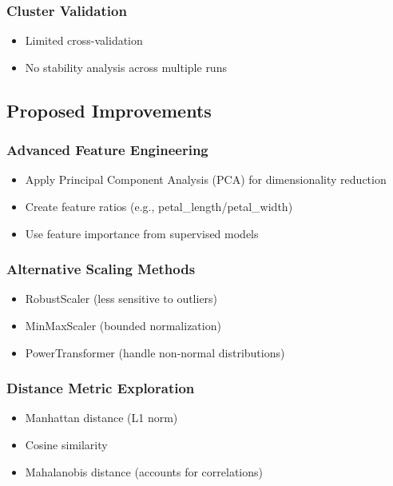 \documentclass[12pt,a4paper]{article}
\begin{document}
\subsubsection{Cluster Validation}
\begin{itemize}
    \item Limited cross-validation
    \item No stability analysis across multiple runs
\end{itemize}

\subsection{Proposed Improvements}

\subsubsection{Advanced Feature Engineering}
\begin{itemize}
    \item[$\checkmark$] Apply Principal Component Analysis (PCA) for dimensionality reduction
    \item[$\checkmark$] Create feature ratios (e.g., petal\_length/petal\_width)
    \item[$\checkmark$] Use feature importance from supervised models
\end{itemize}

\subsubsection{Alternative Scaling Methods}
\begin{itemize}
    \item[$\checkmark$] RobustScaler (less sensitive to outliers)
    \item[$\checkmark$] MinMaxScaler (bounded normalization)
    \item[$\checkmark$] PowerTransformer (handle non-normal distributions)
\end{itemize}

\subsubsection{Distance Metric Exploration}
\begin{itemize}
    \item[$\checkmark$] Manhattan distance (L1 norm)
    \item[$\checkmark$] Cosine similarity
    \item[$\checkmark$] Mahalanobis distance (accounts for correlations)
\end{itemize}
\end{document}
